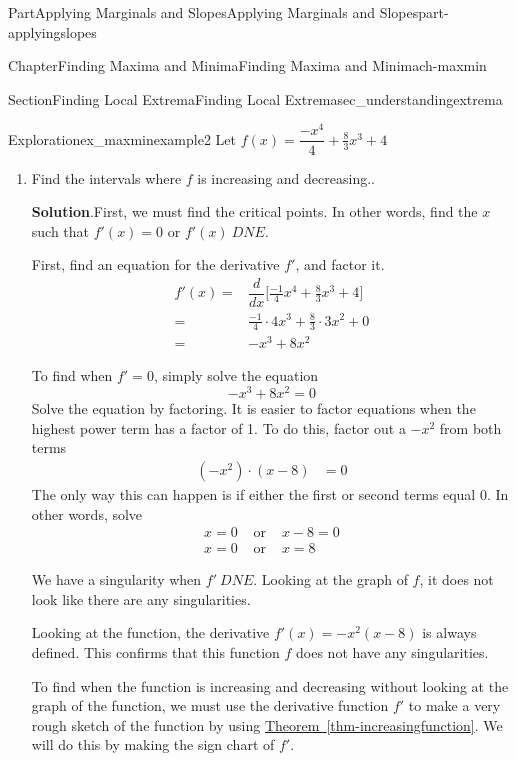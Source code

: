 \documentclass[oneside,10pt,]{tufte-book}
\newcommand{\blocktitlefont}{\relax}
\newcommand{\xreffont}{\relax}
\numberwithin{equation}{chapter}
\newcommand{\ddx}[1]{ \dfrac{d}{dx} \Big[ #1 \Big]  }
\newcommand{\amp}{&}
\begin{document}
\begin{partptx}{Part}{Applying Marginals and Slopes}{}{Applying Marginals and Slopes}{}{}{part-applyingslopes}
\begin{chapterptx}{Chapter}{Finding Maxima and Minima}{}{Finding Maxima and Minima}{}{}{ch-maxmin}
\begin{sectionptx}{Section}{Finding Local Extrema}{}{Finding Local Extrema}{}{}{sec_understandingextrema}
\begin{exploration}{Exploration}{}{ex_maxminexample2}
Let \(f(x) = \dfrac{-x^4}{4} + \frac{8}{3}x^3 + 4\)%
\begin{enumerate}[font=\bfseries,label=(\alph*),ref=\alph*]%
\item{}Find the intervals where \(f\) is increasing and decreasing..%
\par\smallskip%
\noindent\textbf{\blocktitlefont Solution}.\hypertarget{ex_maxminexample2-2-2}{}\quad{}First, we must find the critical points. In other words, find the \(x\) such that \(f'(x) =0\) or \(f'(x) \ DNE\).%
\par
First, find an equation for the derivative \(f'\), and factor it.%
\begin{align*}
f'(x) = \amp \ddx{ \frac{-1}{4} x^4 + \frac{8}{3} x^3 + 4   } \\
= \amp \frac{-1}{4}\cdot 4x^3 + \frac{8}{3} \cdot 3x^2 + 0 \\
= \amp -x^3 + 8x^2
\end{align*}
%
\par
To find when \(f'=0\), simply solve the equation%
\begin{equation*}
-x^3 + 8x^2     = 0
\end{equation*}
Solve the equation by factoring. It is easier to factor equations when the highest power term has a factor of 1. To do this, factor out a \(-x^2\) from both terms%
\begin{align*}
(-x^2) \cdot (x - 8) \amp =  0 
\end{align*}
The only way this can happen is if either the first or second terms equal 0.  In other words, solve%
\begin{align*}
x = 0 \amp \text{ or } \amp x-8=0 \\
x = 0 \amp \text{ or } \amp x=8   
\end{align*}
%
\par
We have a singularity when \(f'\ DNE\). Looking at the graph of \(f\), it does not look like there are any singularities.%
\par
Looking at the function, the derivative \(f'(x) = -x^2(x-8)\) is always defined. This confirms that this function \(f\) does not have any singularities.%
\par
To find when the function is increasing and decreasing without looking at the graph of the function, we must use  the derivative function \(f'\) to make a very rough sketch of the function by using \hyperref[thm-increasingfunction]{Theorem~{\xreffont\ref{thm-increasingfunction}}}. We will do this by making the sign chart of \(f'\).%
\par

\end{enumerate}
\end{exploration}
\end{sectionptx}
\end{chapterptx}
\end{partptx}
\end{document}
